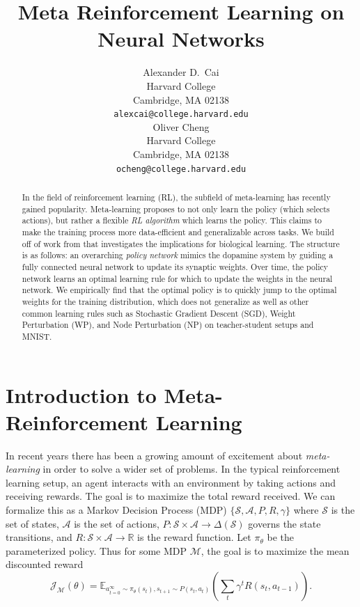 \documentclass{article}
\title{Meta Reinforcement Learning on Neural Networks}
\author{%
  Alexander D.~Cai \\
  Harvard College \\
  Cambridge, MA 02138 \\
  \texttt{alexcai@college.harvard.edu} \\
  \And
  Oliver Cheng \\
  Harvard College \\
  Cambridge, MA 02138 \\
  \texttt{ocheng@college.harvard.edu} \\
}
\begin{document}
\maketitle

\begin{abstract}
  In the field of reinforcement learning (RL), the subfield of meta-learning has recently gained popularity. Meta-learning proposes to not only learn the policy (which selects actions), but rather a flexible \emph{RL algorithm} which learns the policy. This claims to make the training process more data-efficient and generalizable across tasks. We build off of work from \citet{wang2018pfc} that investigates the implications for biological learning. The structure is as follows: an overarching \emph{policy network} mimics the dopamine system by guiding a fully connected neural network to 
  update its synaptic weights. Over time, the policy network learns an optimal learning rule for which to update
  the weights in the neural network. We empirically find that the optimal policy is to quickly jump to the optimal weights for the training distribution, which does
  not generalize as well as other common learning rules such as Stochastic Gradient Descent (SGD), Weight Perturbation (WP), and Node Perturbation (NP) on teacher-student setups and MNIST.
\end{abstract}

\section{Introduction to Meta-Reinforcement Learning}

In recent years there has been a growing amount of excitement about 
\emph{meta-learning} in order to solve a wider set of problems.
In the typical reinforcement learning setup, an agent interacts with an environment by taking actions and receiving rewards. The goal is to maximize the total reward received. We can 
formalize this as a Markov 
Decision Process (MDP) $\{ \mathcal{S}, \mathcal{A}, P, R, \gamma \}$ where $\mathcal{S}$ is the set of states, $\mathcal{A}$ is the set 
of actions, $P:\mathcal{S} \times \mathcal{A} \to \Delta(\mathcal{S})$ governs the state transitions, and $R: \mathcal{S} \times \mathcal{A} \to \mathbb{R}$ is the reward function. Let 
$\pi_\theta$ be the parameterized policy. 
Thus for some MDP $\mathcal{M}$, the goal is to maximize the mean discounted reward 
\[ \mathcal{J}_{\mathcal{M}}(\theta) = \mathbb{E}_{a_{t=0}^{\infty} \sim \pi_\theta(s_t), s_{t+1}
 \sim P(s_t, a_t)} \left( \sum_t \gamma^t R(s_t, a_{t-1}) \right).\]
\end{document}
